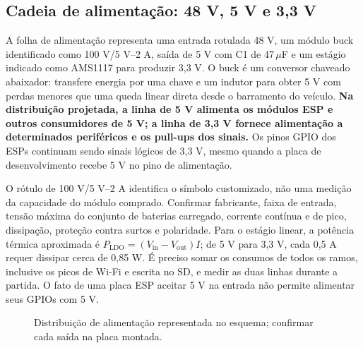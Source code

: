 \subsection{Cadeia de alimentação: 48 V, 5 V e 3,3 V}
A folha de alimentação representa uma entrada rotulada 48 V, um módulo buck identificado como 100 V/5 V--2 A, saída de 5 V com C1 de 47\,$\mu$F e um estágio indicado como AMS1117 para produzir 3,3 V. O buck é um conversor chaveado abaixador: transfere energia por uma chave e um indutor para obter 5 V com perdas menores que uma queda linear direta desde o barramento do veículo. \textbf{Na distribuição projetada, a linha de 5 V alimenta os módulos ESP e outros consumidores de 5 V; a linha de 3,3 V fornece alimentação a determinados periféricos e os pull-ups dos sinais.} Os pinos GPIO dos ESPs continuam sendo sinais lógicos de 3,3 V, mesmo quando a placa de desenvolvimento recebe 5 V no pino de alimentação.

O rótulo de 100 V/5 V--2 A identifica o símbolo customizado, não uma medição da capacidade do módulo comprado. Confirmar fabricante, faixa de entrada, tensão máxima do conjunto de baterias carregado, corrente contínua e de pico, dissipação, proteção contra surtos e polaridade. Para o estágio linear, a potência térmica aproximada é $P_{\mathrm{LDO}}=(V_{\mathrm{in}}-V_{\mathrm{out}})I$; de 5 V para 3,3 V, cada 0,5 A requer dissipar cerca de 0,85 W. É preciso somar os consumos de todos os ramos, inclusive os picos de Wi-Fi e escrita no SD, e medir as duas linhas durante a partida. O fato de uma placa ESP aceitar 5 V na entrada não permite alimentar seus GPIOs com 5 V.

\begin{figure}[htbp]\centering
{}
\caption{Distribuição de alimentação representada no esquema; confirmar cada saída na placa montada.}\label{fig:alimentacao}
\end{figure}

